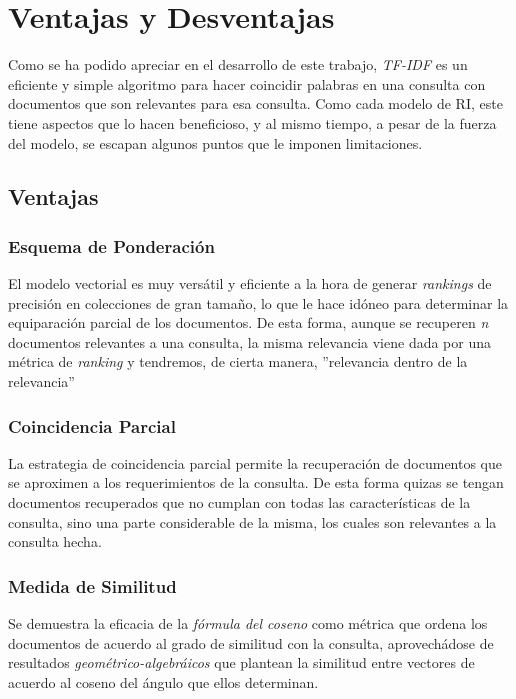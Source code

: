 \section{Ventajas y Desventajas}

Como se ha podido apreciar en el desarrollo de este trabajo, \emph{TF-IDF} es
un eficiente y simple algoritmo para hacer coincidir palabras en una consulta
con documentos que son relevantes para esa consulta. Como cada
modelo de RI, este tiene aspectos que lo hacen beneficioso, y al mismo tiempo,
a pesar de la fuerza del modelo, se escapan algunos puntos que le imponen
limitaciones.

\subsection{Ventajas}

\subsubsection{Esquema de Ponderación}

El modelo vectorial es muy versátil y eficiente a la hora de generar
\emph{rankings} de precisión en colecciones de gran tamaño, lo que le hace
idóneo para determinar la equiparación parcial de los documentos. De esta
forma, aunque se recuperen \emph{n} documentos relevantes a una consulta, la
misma relevancia viene dada por una métrica de \emph{ranking} y tendremos, de
cierta manera, ''relevancia dentro de la relevancia''

\subsubsection{Coincidencia Parcial}

La estrategia de coincidencia parcial permite la recuperación de documentos
que se aproximen a los requerimientos de la consulta. De esta forma quizas se
tengan documentos recuperados que no cumplan con todas las características de
la consulta, sino una parte considerable de la misma, los cuales son relevantes
a la consulta hecha.

\subsubsection{Medida de Similitud}

Se demuestra la eficacia de la \emph{fórmula del coseno} como métrica que
ordena los documentos de acuerdo al grado de similitud con la consulta,
aprovechádose de resultados \emph{geométrico-algebráicos} que plantean la
similitud entre vectores de acuerdo al coseno del ángulo que ellos determinan. 

